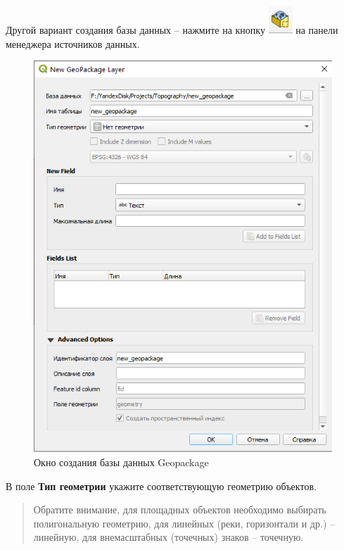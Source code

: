 \documentclass[
  12pt,
]{book}
\begin{document}
Другой вариант создания базы данных -- нажмите на кнопку \includegraphics{images/vector/New_gpkg_layer.png} на панели менеджера источников данных.

\begin{figure}
\centering
\includegraphics{images/vector/Create_gpkg.png}
\caption{Окно создания базы данных Geopackage}
\end{figure}

В поле \textbf{Тип геометрии} укажите соответствующую геометрию объектов.

\begin{quote}
Обратите внимание, для площадных объектов необходимо выбирать полигональную геометрию, для линейных (реки, горизонтали и др.) -- линейную, для внемасштабных (точечных) знаков -- точечную.
\end{quote}
\end{document}
